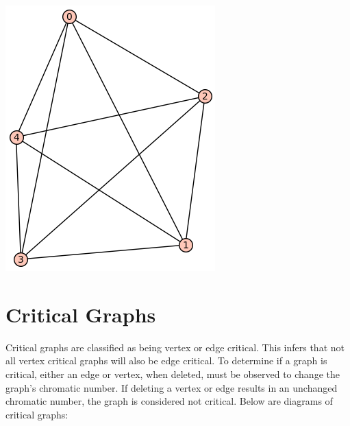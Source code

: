 \documentclass[12pt, letterpaper, twoside]{article}
\begin{document}
\includegraphics[scale=.35]{test}

\section{Critical Graphs}
Critical graphs are classified as being vertex or edge critical. This infers that not all vertex critical graphs will also be edge critical. To determine if a graph is critical, either an edge or vertex, when deleted, must be observed to change the graph's chromatic number. 
If deleting a vertex or edge results in an unchanged chromatic number, the graph is considered not critical.
Below are diagrams of critical graphs:
\end{document}
